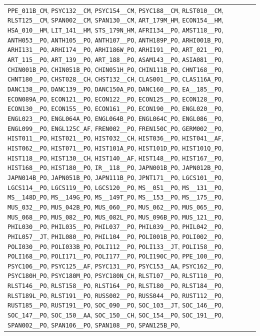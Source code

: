 \begin{longtable}{|p{4.4in}|p{4.4in}|}
\verb|PPE_011B_CM|, \verb|PSYC132__CM|, \verb|PSYC154__CM|, \verb|PSYC188__CM|, \verb|RLST010__CM|, \verb|RLST125__CM|, \verb|SPAN002__CM|, \verb|SPAN130__CM|, \verb|ART_179M_HM|, \verb|ECON154__HM|, \verb|HSA_010__HM|, \verb|LIT_141__HM|, \verb|STS_179N_HM|, \verb|AFRI134__PO|, \verb|AMST118__PO|, \verb|ANTH053__PO|, \verb|ANTH105__PO|, \verb|ANTH107__PO|, \verb|ANTH189P_PO|, \verb|ARHI001B_PO|, \verb|ARHI131__PO|, \verb|ARHI174__PO|, \verb|ARHI186W_PO|, \verb|ARHI191__PO|, \verb|ART_021__PO|, \verb|ART_115__PO|, \verb|ART_139__PO|, \verb|ART_188__PO|, \verb|ASAM143__PO|, \verb|ASIA081__PO|, \verb|CHIN001B_PO|, \verb|CHIN051B_PO|, \verb|CHIN051H_PO|, \verb|CHIN111B_PO|, \verb|CHNT168__PO|, \verb|CHNT180__PO|, \verb|CHST028__CH|, \verb|CHST132__CH|, \verb|CLAS001__PO|, \verb|CLAS116A_PO|, \verb|DANC138__PO|, \verb|DANC139__PO|, \verb|DANC150A_PO|, \verb|DANC160__PO|, \verb|EA__185__PO|, \verb|ECON089A_PO|, \verb|ECON121__PO|, \verb|ECON122__PO|, \verb|ECON125__PO|, \verb|ECON128__PO|, \verb|ECON130__PO|, \verb|ECON155__PO|, \verb|ECON161__PO|, \verb|ECON190__PO|, \verb|ENGL020__PO|, \verb|ENGL023__PO|, \verb|ENGL064A_PO|, \verb|ENGL064B_PO|, \verb|ENGL064C_PO|, \verb|ENGL086__PO|, \verb|ENGL099__PO|, \verb|ENGL125C_AF|, \verb|FREN002__PO|, \verb|FREN150C_PO|, \verb|GERM002__PO|, \verb|HIST011__PO|, \verb|HIST021__PO|, \verb|HIST032__CH|, \verb|HIST036__PO|, \verb|HIST041__AF|, \verb|HIST062__PO|, \verb|HIST071__PO|, \verb|HIST101A_PO|, \verb|HIST101D_PO|, \verb|HIST101Q_PO|, \verb|HIST118__PO|, \verb|HIST130__CH|, \verb|HIST140__AF|, \verb|HIST148__PO|, \verb|HIST167__PO|, \verb|HIST168__PO|, \verb|HIST180__PO|, \verb|IR__118__PO|, \verb|JAPN001B_PO|, \verb|JAPN012B_PO|, \verb|JAPN014B_PO|, \verb|JAPN051B_PO|, \verb|JAPN111B_PO|, \verb|JPNT171__PO|, \verb|LGCS101__PO|, \verb|LGCS114__PO|, \verb|LGCS119__PO|, \verb|LGCS120__PO|, \verb|MS__051__PO|, \verb|MS__131__PO|, \verb|MS__148D_PO|, \verb|MS__149G_PO|, \verb|MS__149T_PO|, \verb|MS__153__PO|, \verb|MS__175__PO|, \verb|MUS_032__PO|, \verb|MUS_042B_PO|, \verb|MUS_060__PO|, \verb|MUS_062__PO|, \verb|MUS_065__PO|, \verb|MUS_068__PO|, \verb|MUS_082__PO|, \verb|MUS_082L_PO|, \verb|MUS_096B_PO|, \verb|MUS_121__PO|, \verb|PHIL030__PO|, \verb|PHIL035__PO|, \verb|PHIL037__PO|, \verb|PHIL039__PO|, \verb|PHIL042__PO|, \verb|PHIL057__JT|, \verb|PHIL080__PO|, \verb|PHIL104__PO|, \verb|POLI001B_PO|, \verb|POLI002__PO|, \verb|POLI030__PO|, \verb|POLI033B_PO|, \verb|POLI112__PO|, \verb|POLI133__JT|, \verb|POLI158__PO|, \verb|POLI168__PO|, \verb|POLI171__PO|, \verb|POLI177__PO|, \verb|POLI190C_PO|, \verb|PPE_100__PO|, \verb|PSYC106__PO|, \verb|PSYC125__AF|, \verb|PSYC131__PO|, \verb|PSYC153__AA|, \verb|PSYC162__PO|, \verb|PSYC180H_PO|, \verb|PSYC180M_PO|, \verb|PSYC180N_CH|, \verb|RLST107__PO|, \verb|RLST110__PO|, \verb|RLST146__PO|, \verb|RLST158__PO|, \verb|RLST164__PO|, \verb|RLST180__PO|, \verb|RLST184__PO|, \verb|RLST189L_PO|, \verb|RLST191__PO|, \verb|RUSS002__PO|, \verb|RUSS044__PO|, \verb|RUST112__PO|, \verb|RUST185__PO|, \verb|RUST191__PO|, \verb|SOC_090__PO|, \verb|SOC_103__JT|, \verb|SOC_146__PO|, \verb|SOC_147__PO|, \verb|SOC_150__AA|, \verb|SOC_150__CH|, \verb|SOC_154__PO|, \verb|SOC_191__PO|, \verb|SPAN002__PO|, \verb|SPAN106__PO|, \verb|SPAN108__PO|, \verb|SPAN125B_PO|, 
\end{longtable}
